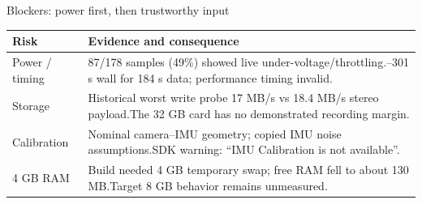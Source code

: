 \begin{frame}{Blockers: power first, then trustworthy input}
\begin{tabular}{@{}L{43mm}L{140mm}@{}}\toprule
\textbf{Risk} & \textbf{Evidence and consequence}\\\midrule
Power / timing & 87/178 samples (49\%) showed live under-voltage/throttling.--301 s wall for 184 s data; performance timing invalid.\\[9pt]
Storage & Historical worst write probe 17 MB/s vs 18.4 MB/s stereo payload.\newline The 32 GB card has no demonstrated recording margin.\\[9pt]
Calibration & Nominal camera--IMU geometry; copied IMU noise assumptions.\newline SDK warning: ``IMU Calibration is not available''.\\[9pt]
4 GB RAM & Build needed 4 GB temporary swap; free RAM fell to about 130 MB.\newline Target 8 GB behavior remains unmeasured.\\\bottomrule
\end{tabular}
\end{frame}

